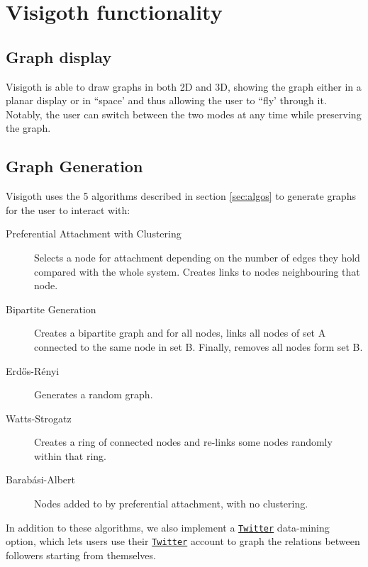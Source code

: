 \documentclass[a4paper,11pt,titlepage]{article}
\let\stdhref\href
\renewcommand{\href}[2]{\stdhref{#1}{\texttt{#2}}}
\let\stdsection\section         %
\renewcommand{\section}{\newpage\stdsection}
\newcommand{\Twitter}{\href{http://twitter.com}{Twitter} }
\begin{document}
\section{Visigoth functionality}


\subsection{Graph display}
Visigoth is able to draw graphs in both 2D and 3D, showing the graph either
in a planar display or in ``space' and thus allowing the user to ``fly' through
it. Notably, the user can switch between the two modes at any time while
preserving the graph.

\subsection{Graph Generation}
Visigoth uses the 5 algorithms described in section \ref{sec:algos} to generate
graphs for the user to interact with:

\begin{description}
\item [Preferential Attachment with Clustering] Selects a node for attachment
  depending on the number of edges they hold compared with the whole
  system. Creates links to nodes neighbouring that node.

\item [Bipartite Generation] Creates a bipartite graph and for all nodes, links
  all nodes of set A connected to the same node in set B. Finally, removes all
  nodes form set B.

\item [Erd\H{o}s-R\'{e}nyi] Generates a random graph.

\item [Watts-Strogatz] Creates a ring of connected nodes and re-links some nodes
  randomly within that ring.

\item [Barab\'{a}si-Albert] Nodes added to by preferential attachment, with no
  clustering.
\end{description}

In addition to these algorithms, we also implement a \Twitter data-mining
option, which lets users use their \Twitter account to graph the relations
between followers starting from themselves.
\end{document}
